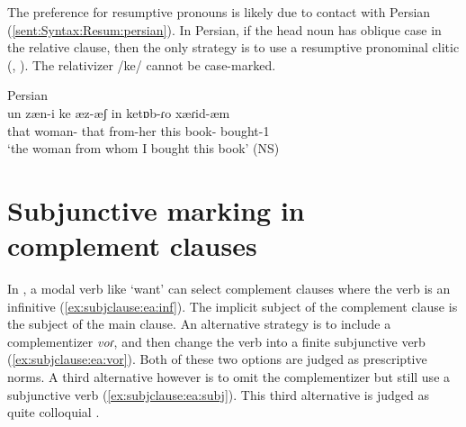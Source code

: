 The preference for resumptive pronouns is likely due to contact with Persian (\ref{sent:Syntax:Resum:persian}). In Persian, if the head noun has oblique case in the relative clause, then  the only strategy   is to use a resumptive pronominal clitic   (\citealt[34]{Mahootian-2002-PersianGrammar}, \citealt[2]{Abdollahnejad-2018-CompetingGrammarLanguageAcquisitionPersianRelativeCLause}). The relativizer /ke/ cannot be case-marked. 

\begin{exe}
	\ex Persian \\\gll  un zæn-i ke æz-æʃ in ketɒb-ɾo xæɾid-æm  \\
	that woman-{}  that from-her this book-{\om} bought-1{\sg} \\
	\trans `the woman from whom I bought this book'  \hfill (NS) \label{sent:Syntax:Resum:persian} \\
\end{exe}







\section{Subjunctive marking in complement clauses}\label{section:syntax:subj}

In {\seaSEA}, a modal verb like `want' can select complement clauses where the verb is an infinitive (\ref{ex:subjclause:ea:inf}). The implicit subject of the complement clause is the subject of the main clause. An alternative strategy is to include a complementizer \textit{voɾ}, and then change the verb into   a finite subjunctive verb (\ref{ex:subjclause:ea:vor}). Both of these two options are judged as prescriptive norms. A third alternative however is to omit the complementizer but still use a subjunctive verb (\ref{ex:subjclause:ea:subj}). This third alternative is judged as quite colloquial      \citep[425--427]{DumTragut-2009-ArmenianReferenceGrammar}.  


